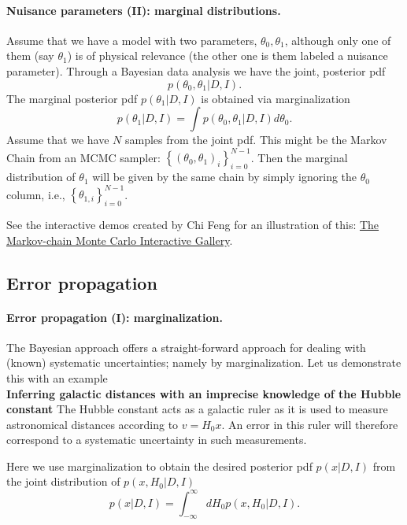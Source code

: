 \documentclass[%
oneside,                 %
final,                   %
10pt]{article}
\begin{document}
\paragraph{Nuisance parameters (II): marginal distributions.}
Assume that we have a model with two parameters, $\theta_0,\theta_1$, although only one of them (say $\theta_1$) is of physical relevance (the other one is them labeled a nuisance parameter). Through a Bayesian data analysis we have the joint, posterior pdf
\[
p(\theta_0, \theta_1 | D, I).
\]
The marginal posterior pdf $p(\theta_1 | D, I)$ is obtained via marginalization
\[
p(\theta_1 | D, I) = \int p(\theta_0, \theta_1 | D, I) d\theta_0.
\]
Assume that we have $N$ samples from the joint pdf. This might be the Markov Chain from an MCMC sampler: $\left\{ (\theta_0, \theta_1)_i \right\}_{i=0}^{N-1}$. Then the marginal distribution of $\theta_1$ will be given by the same chain by simply ignoring the $\theta_0$ column, i.e., $\left\{ \theta_{1,i} \right\}_{i=0}^{N-1}$. 

See the interactive demos created by Chi Feng for an illustration of this: \href{{https://chi-feng.github.io/mcmc-demo/}}{The Markov-chain Monte Carlo Interactive Gallery}.

\subsection{Error propagation}

\paragraph{Error propagation (I): marginalization.}
The Bayesian approach offers a straight-forward approach for dealing with (known) systematic uncertainties; namely by marginalization. Let us demonstrate this with an example \\

\textbf{Inferring galactic distances with an imprecise knowledge of the Hubble constant}
The Hubble constant acts as a galactic ruler as it is used to measure astronomical distances according to $v = H_0 x$. An error in this ruler will therefore correspond to a systematic uncertainty in such measurements.

Here we use marginalization to obtain the desired posterior pdf $p(x|D,I)$ from the joint distribution of $p(x,H_0|D,I)$
\begin{equation}
p(x|D,I) = \int_{-\infty}^\infty dH_0 p(x,H_0|D,I).
\label{eq:marginalization}
\end{equation}
\end{document}
